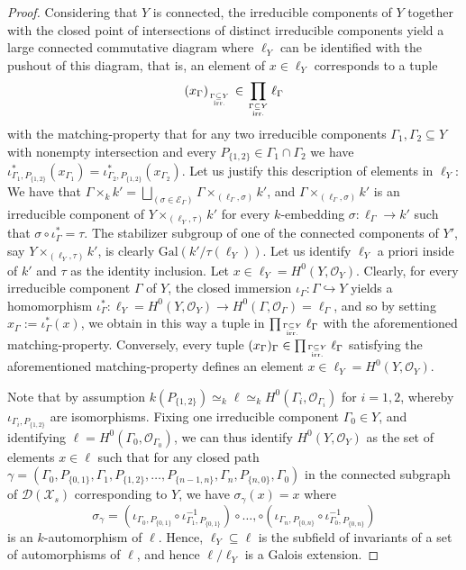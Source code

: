 \documentclass[a4paper,12pt,reqno]{amsart}
\newcommand\mc\mathcal
\theoremstyle{definition}
\numberwithin{equation}{thm}
\begin{document}
\begin{proof}
Considering that $Y$ is connected, the irreducible components of $Y$ together with the closed point of intersections of distinct irreducible components yield a large connected commutative diagram where $\ell_Y$ can be identified with the pushout of this diagram, that is, an element of $x\in \ell_Y$ corresponds to a tuple $$(x_\Gamma)_{_{{\Gamma  \subseteq Y} \atop \text{irr.} }} \in  \prod_{\Gamma \subseteq Y \atop \text{irr.}} \ell_\Gamma$$
with the matching-property that for any two irreducible components  
$\Gamma_1, \Gamma_2 \subseteq Y$ with nonempty intersection and every  $P_{\{1,2\}} \in  \Gamma_1\cap \Gamma_2$ we have $\iota^*_{\Gamma_1,P_{\{1,2\}}}(x_{\Gamma_1}) = \iota^*_{\Gamma_2,P_{\{1,2\}}} (x_{\Gamma_2})$. Let us justify this description of elements in $\ell_Y$:
We have that $\Gamma \times_k k' = \bigsqcup_{(\sigma \in \mc{E}_\Gamma)} \Gamma \times_{(\ell_\Gamma, \sigma)} k'$, and $\Gamma \times_{(\ell_\Gamma, \sigma)} k'$ is an irreducible component of $Y \times_{(\ell_Y, \tau)} k'$  for every $k$-embedding $\sigma: \ell_\Gamma \to k'$ such that $\sigma \circ \iota^*_{\Gamma}  = \tau$. 
The stabilizer subgroup of one of the connected components of $Y'$, say $Y \times_{(\ell_Y, \tau)} k'$, is clearly $\mathrm{Gal}(k'/ \tau(\ell_Y))$. Let us identify $\ell_Y$  a priori inside of $k'$ and $\tau$ as the identity inclusion.
Let $x \in \ell_Y=H^0(Y, \mathcal{O}_Y)$. Clearly, for every irreducible component $\Gamma$ of $Y$, the closed immersion $\iota_{\Gamma}: \Gamma \hookrightarrow Y$ yields a homomorphism $\iota_{\Gamma}^*: \ell_Y=H^0(Y, \mathcal{O}_Y) \to H^0(\Gamma, \mathcal{O}_\Gamma)=\ell_\Gamma$, and so by setting $x_\Gamma:= \iota^*_{\Gamma}(x)$, we obtain in this way a tuple in $\prod_{\Gamma \subseteq Y \atop \text{irr.}} \ell_\Gamma$ with the aforementioned matching-property. 
 Conversely, every tuple $(x_\Gamma)_\Gamma \in \prod_{\Gamma \subseteq Y \atop \text{irr.}} \ell_\Gamma$ satisfying the  aforementioned matching-property defines an element  $x \in \ell_Y=H^0(Y, \mathcal{O}_Y)$. 
 
 Note that by assumption $k(P_{\{1,2\}})\simeq_k \ell \simeq_k H^0(\Gamma_i, \mathcal{O}_{\Gamma_i})$ for $i=1,2$,  whereby $\iota_{\Gamma_i,P_{\{1,2\}}}$ are isomorphisms.
Fixing one irreducible component $\Gamma_0 \in Y$, and identifying $\ell=H^0(\Gamma_0, \mathcal{O}_{\Gamma_0})$, we can thus identify $H^0(Y, \mathcal{O}_Y)$ as the set of elements $x \in \ell$ such that for any closed path $\gamma= (\Gamma_0, P_{\{0,1\}}, \Gamma_1, P_{\{1,2\}}, \ldots, P_{\{n-1,n\}}, \Gamma_n, P_{\{n,0\}}, \Gamma_0)$ in the connected subgraph of $\mc{D}(\mc{X}_s)$ corresponding to $Y$, we have  $\sigma_\gamma(x)=x$ where $$\sigma_\gamma=\left(\iota_{\Gamma_0, P_{\{0,1\}}} \circ \iota^{-1}_{\Gamma_1, P_{\{0,1\}}} \right) \circ  \ldots, \circ \left(\iota_{\Gamma_n, P_{\{0,n\}}} \circ \iota^{-1}_{\Gamma_0, P_{\{0,n\}}} \right)$$
is an $k$-automorphism of $\ell$. Hence, $\ell_Y \subseteq \ell$ is the subfield of invariants of a set of automorphisms of $\ell$, and hence $\ell/\ell_Y$ is a Galois extension. 
\end{proof}
\end{document}
